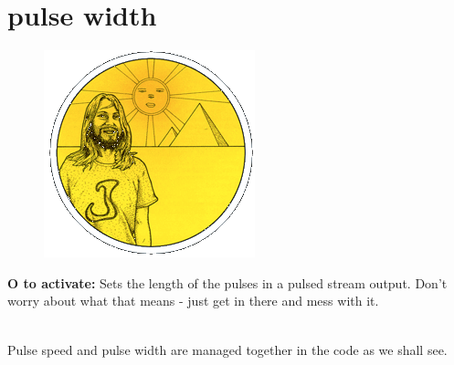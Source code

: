 \section*{pulse width}
\begin{definition}
\setlength{\intextsep}{0pt}%
\setlength{\columnsep}{3pt}%
\begin{figure}
\includegraphics[width=\linewidth]{src/callout/psych.png} 
\end{figure}
\small
\textbf{O to activate:} Sets the length of the pulses in a
pulsed stream output. Don’t worry about what that means - just get
in there and mess with it.
\\
\\
\end{definition}

Pulse speed and pulse width are managed together in the code as we shall
see. 

